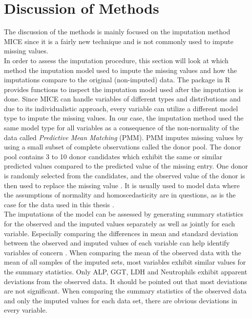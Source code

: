\section{Discussion of Methods}
The discussion of the methods is mainly focused on the imputation method MICE 
since it is a fairly new technique and is not commonly used to impute missing 
values.
\\
In order to assess the imputation procedure, this section will look at which 
method the imputation model used to impute the missing values and how the 
imputations compare to the original (non-imputed) data. The  
package in R provides functions to inspect the imputation model used after the 
imputation is done. Since MICE can handle variables of different types and 
distributions and due to its individualistic approach, every variable can 
utilize a different model type to impute the missing values. In our case, the 
imputation method used the same model type for all variables as a consequence 
of the non-normality of the data called \textit{Predictive Mean Matching} (PMM).
PMM imputes missing values by using a small subset of complete observations 
called the donor pool. The donor pool contains 3 to 10 donor candidates which 
exhibit the same or similar predicted values compared to the predicted value of 
the missing entry. One donor is randomly selected from the candidates, and the
observed value of the donor is then used to replace the missing value 
\cite{RN144, RN145, RN146}. It is usually used to model data where the 
assumptions of normality and homoscedasticity are in questions, as is the case 
for the data used in this thesis \cite{RN146}.
\\
The imputations of the model can be assessed by generating summary statistics 
for the observed and the imputed values separately as well as jointly for each 
variable.
Especially comparing the differences in mean and standard deviation 
between the observed and imputed values of each variable can help identify 
variables of concern \cite{RN141}. When comparing the mean of the observed data 
with the mean of all samples of the imputed sets, most variables exhibit 
similar values for the summary statistics. Only ALP, GGT, LDH and Neutrophils 
exhibit apparent deviations from the observed data. It should be pointed out 
that most deviations are not significant.
When comparing the summary statistics of the observed data and only the imputed 
values for each data set, there are obvious deviations in every variable. 

